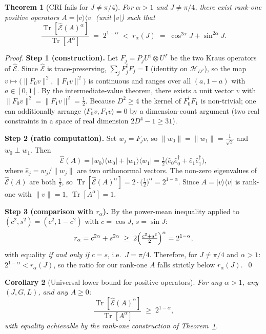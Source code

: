 \documentclass[12pt,a4paper]{article}
\newtheorem{theorem}{Theorem}[section]
\newtheorem{corollary}[theorem]{Corollary}
\begin{document}
\begin{theorem}[CRI fails for $J\neq\pi/4$]
\label{thm:cri_fails}
For $\alpha>1$ and $J\neq\pi/4$, there exist rank-one positive operators
$A=\lvert v\rangle\langle v\rvert$ (unit $\lvert v\rvert$) such that
\[
  \frac{\operatorname{Tr}[\hat{\mathcal{E}}(A)^\alpha]}{\operatorname{Tr}[A^\alpha]}
  \;=\; 2^{1-\alpha}
  \;<\; r_\alpha(J)
  \;=\; \cos^{2\alpha}J + \sin^{2\alpha}J.
\]
\end{theorem}

\begin{proof}
\textbf{Step 1 (construction).}
Let $F_j = P_j U^\dagger\otimes U^T$ be the two Kraus operators of $\hat{\mathcal{E}}$.
Since $\hat{\mathcal{E}}$ is trace-preserving, $\sum_j F_j^\dagger F_j = \mathbf{I}$
(identity on $\mathcal{H}_{D^2}$), so the map $v\mapsto\bigl(\|F_0 v\|^2,\|F_1 v\|^2\bigr)$
is continuous and ranges over all $(a,1-a)$ with $a\in[0,1]$.
By the intermediate-value theorem, there exists a unit vector $v$ with
$\|F_0 v\|^2=\|F_1 v\|^2=\tfrac{1}{2}$.
Because $D^2\geq 4$ the kernel of $F_0^\dagger F_1$ is non-trivial; one can
additionally arrange $\langle F_0 v,F_1 v\rangle=0$ by a dimension-count argument
(two real constraints in a space of real dimension $2D^4-1\geq 31$).

\textbf{Step 2 (ratio computation).}
Set $w_j=F_j v$, so $\|w_0\|=\|w_1\|=\tfrac{1}{\sqrt{2}}$ and $w_0\perp w_1$.
Then
\[
  \hat{\mathcal{E}}(A)
  = \lvert w_0\rangle\langle w_0\rvert + \lvert w_1\rangle\langle w_1\rvert
  = \tfrac{1}{2}\bigl(\hat{e}_0\hat{e}_0^\dagger + \hat{e}_1\hat{e}_1^\dagger\bigr),
\]
where $\hat{e}_j = w_j/\|w_j\|$ are two orthonormal vectors.
The non-zero eigenvalues of $\hat{\mathcal{E}}(A)$ are both $\tfrac{1}{2}$, so
$\operatorname{Tr}[\hat{\mathcal{E}}(A)^\alpha]=2\cdot\bigl(\tfrac{1}{2}\bigr)^\alpha=2^{1-\alpha}$.
Since $A=\lvert v\rangle\langle v\rvert$ is rank-one with $\|v\|=1$,
$\operatorname{Tr}[A^\alpha]=1$.

\textbf{Step 3 (comparison with $r_\alpha$).}
By the power-mean inequality applied to $(c^2,s^2)=(c^2,1-c^2)$ with
$c=\cos J$, $s=\sin J$:
\[
  r_\alpha = c^{2\alpha}+s^{2\alpha}
  \;\geq\; 2\Bigl(\tfrac{c^2+s^2}{2}\Bigr)^\alpha = 2^{1-\alpha},
\]
with equality \emph{if and only if} $c=s$, i.e.\ $J=\pi/4$.
Therefore, for $J\neq\pi/4$ and $\alpha>1$:
$2^{1-\alpha} < r_\alpha(J)$, so the ratio for our rank-one $A$ falls strictly
below $r_\alpha(J)$.~\qed
\end{proof}

\begin{corollary}[Universal lower bound for positive operators]
\label{cor:min_ratio_pos}
For any $\alpha>1$, any $(J,G,L)$, and any $A\geq 0$:
\[
  \frac{\operatorname{Tr}[\hat{\mathcal{E}}(A)^\alpha]}{\operatorname{Tr}[A^\alpha]}
  \;\geq\; 2^{1-\alpha},
\]
with equality achievable by the rank-one construction of Theorem~\ref{thm:cri_fails}.
\end{corollary}
\end{document}
